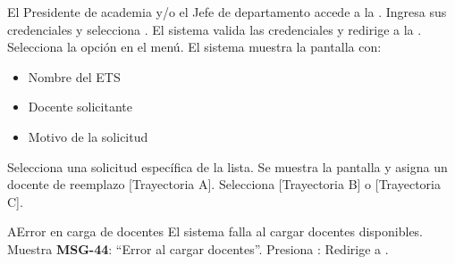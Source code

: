 \begin{UCtrayectoria}
	\UCpaso[\UCactor] El Presidente de academia y/o el Jefe de departamento accede a la .
	\UCpaso[\UCactor] Ingresa sus credenciales y selecciona .
	\UCpaso El sistema valida las credenciales y redirige a la .
	\UCpaso[\UCactor] Selecciona la opción  en el menú.
	\UCpaso El sistema muestra la pantalla  con:
	\begin{itemize}
		\item Nombre del ETS
		\item Docente solicitante
		\item Motivo de la solicitud
	\end{itemize} 
	\UCpaso[\UCactor] Selecciona una solicitud específica de la lista.
	\UCpaso[\UCactor] Se muestra la pantalla  y asigna un docente de reemplazo [Trayectoria A].
	\UCpaso[\UCactor] Selecciona  [Trayectoria B] o  [Trayectoria C].
\end{UCtrayectoria}
\begin{UCtrayectoriaA}{A}{Error en carga de docentes}
	\UCpaso El sistema falla al cargar docentes disponibles.
	\UCpaso Muestra \textbf{MSG-44}: ``Error al cargar docentes''.
	\UCpaso[\UCactor] Presiona : Redirige a .
\end{UCtrayectoriaA}

